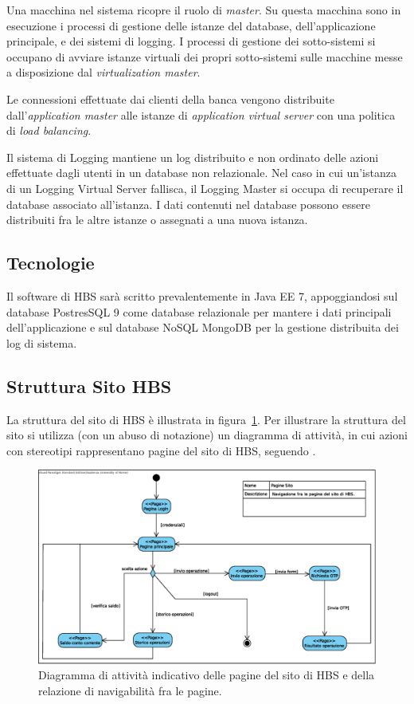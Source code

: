 Una macchina nel sistema ricopre il ruolo di \emph{master}.
Su questa macchina sono in esecuzione i processi di gestione delle istanze del database, dell'applicazione principale, e dei sistemi di logging.
I processi di gestione dei sotto-sistemi si occupano di avviare istanze virtuali dei propri sotto-sistemi sulle macchine messe a disposizione dal \emph{virtualization master}.

Le connessioni effettuate dai clienti della banca vengono distribuite dall'\emph{application master} alle istanze di \emph{application virtual server} con una politica di \emph{load balancing}.

Il sistema di Logging mantiene un log distribuito e non ordinato delle azioni effettuate dagli utenti in un database non relazionale.
Nel caso in cui un'istanza di un Logging Virtual Server fallisca, il Logging Master si occupa di recuperare il database associato all'istanza.
I dati contenuti nel database possono essere distribuiti fra le altre istanze o assegnati a una nuova istanza.

\subsection{Tecnologie}

Il software di HBS sar\`a scritto prevalentemente in Java EE 7, appoggiandosi sul database PostresSQL 9 come database relazionale per mantere i dati principali dell'applicazione e sul database NoSQL MongoDB per la gestione distribuita dei log di sistema.

\subsection{Struttura Sito HBS}

La struttura del sito di HBS \`e illustrata in figura~\ref{fig:struttura-sito}.
Per illustrare la struttura del sito si utilizza (con un abuso di notazione) un diagramma di attivit\`a, in cui azioni con stereotipi  rappresentano pagine del sito di HBS, seguendo \cite{activity_pages}.

\begin{figure}[h]
	\centering
	\includegraphics[width=\textwidth]{Images/Pagine_Sito.eps}
	\caption{Diagramma di attivit\`a indicativo delle pagine del sito di HBS e della relazione di navigabilit\`a fra le pagine.}
	\label{fig:struttura-sito}
\end{figure}


